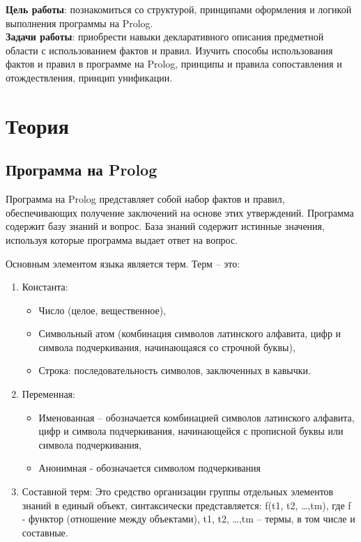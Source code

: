 \documentclass[a4paper,12pt]{article}
\begin{document}
	


\textbf{Цель работы}: познакомиться со структурой, принципами оформления и логикой выполнения программы на Prolog.\\

\textbf{Задачи работы}: приобрести навыки декларативного описания предметной области с использованием фактов и правил.
Изучить способы использования фактов и правил в программе на Prolog, принципы  и правила сопоставления и отождествления, принцип унификации.

\section*{Теория}

\subsection*{Программа на Prolog}

Программа на Prolog представляет собой набор фактов и правил, обеспечивающих получение заключений на основе этих утверждений. Программа содержит базу знаний и вопрос. База знаний содержит истинные значения, используя которые программа выдает ответ на вопрос. 

Основным элементом языка является терм. Терм – это:
\begin{enumerate}
	\item Константа: 
	\begin{itemize}
		\item Число (целое, вещественное),
		\item Символьный атом (комбинация символов латинского алфавита, цифр и символа подчеркивания, начинающаяся со строчной буквы),
		\item Строка: последовательность символов, заключенных в кавычки.
	\end{itemize}
	\item Переменная:
	\begin{itemize}
		\item Именованная – обозначается комбинацией символов латинского алфавита, цифр и символа подчеркивания, начинающейся с прописной буквы или символа подчеркивания,
		\item Анонимная  - обозначается символом подчеркивания
	\end{itemize}
	\item Составной терм:
		Это средство организации группы отдельных элементов знаний в единый  объект,  синтаксически представляется: f(t1, t2, …,tm), где f -  функтор (отношение между объектами), t1, t2, …,tm – термы, в том  числе  и составные.
\end{enumerate}
\end{document}
